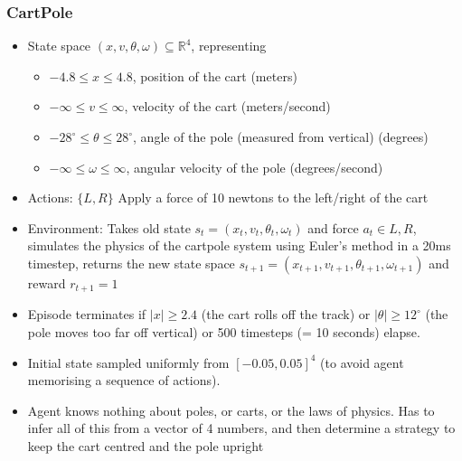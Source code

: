 \documentclass[10pt,a4paper, handout]{beamer}
\begin{document}
\begin{frame}
	\frametitle{CartPole}
	\begin{itemize}
		\item State space $(x, v, \theta, \omega) \subseteq \mathbb{R}^4$, representing
		\begin{itemize}
			\item $-4.8 \leq x \leq 4.8$, position of the cart (meters)
			\item $-\infty \leq v \leq \infty$, velocity of the cart (meters/second)
			\item $-28^\circ \leq \theta \leq 28^\circ$, angle of the pole (measured from vertical) (degrees)
			\item $-\infty \leq \omega \leq \infty$, angular velocity of the pole (degrees/second)  
		\end{itemize}
		\item Actions: $\{L,R\}$ Apply a force of 10 newtons to the left/right of the cart
		\item Environment: Takes old state $s_t = (x_t, v_t, \theta_t, \omega_t)$ and
		force $a_t \in {L,R}$, simulates the physics of the cartpole system using Euler's method
		in a 20ms timestep, returns the new state space 
		$s_{t+1} = (x_{t+1}, v_{t+1}, \theta_{t+1}, \omega_{t+1})$ and reward $r_{t+1} = 1$
		\item Episode terminates if $|x| \geq 2.4$ (the cart rolls off the track)
		or $|\theta| \geq 12^\circ$ (the pole moves too far off vertical) or 500 timesteps (= 10 seconds)
		elapse.
		\item Initial state sampled uniformly from $[-0.05, 0.05]^4$ (to avoid agent memorising 
		a sequence of actions).
		\item Agent knows nothing about poles, or carts, or the laws of physics. Has to infer all of this from
		a vector of 4 numbers, and then determine a strategy to keep the cart centred and the pole upright
	\end{itemize}
\end{frame}
\end{document}
